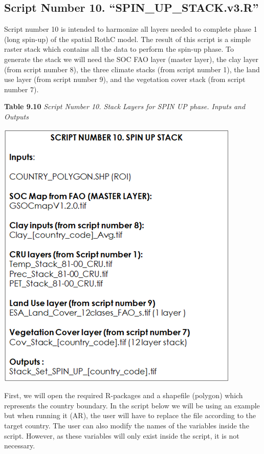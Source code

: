 \documentclass[
  10pt,
  b5paper,
]{book}
\begin{document}
\hypertarget{script-number-10.-spin_up_stack.v3.r}{%
\subsection{Script Number 10. ``SPIN\_UP\_STACK.v3.R''}\label{script-number-10.-spin_up_stack.v3.r}}

Script number 10 is intended to harmonize all layers needed to complete phase 1 (long spin-up) of the spatial RothC model. The result of this script is a simple raster stack which contains all the data to perform the spin-up phase. To generate the stack we will need the SOC FAO layer (master layer), the clay layer (from script number 8), the three climate stacks (from script number 1), the land use layer (from script number 9), and the vegetation cover stack (from script number 7).

\textbf{Table 9.10} \emph{Script Number 10. Stack Layers for SPIN UP phase. Inputs and Outputs}

\includegraphics{tables/Table_9.9.png}

First, we will open the required R-packages and a shapefile (polygon) which represents the country boundary. In the script below we will be using an example but when running it (AR), the user will have to replace the file according to the target country. The user can also modify the names of the variables inside the script. However, as these variables will only exist inside the script, it is not necessary.
\end{document}
